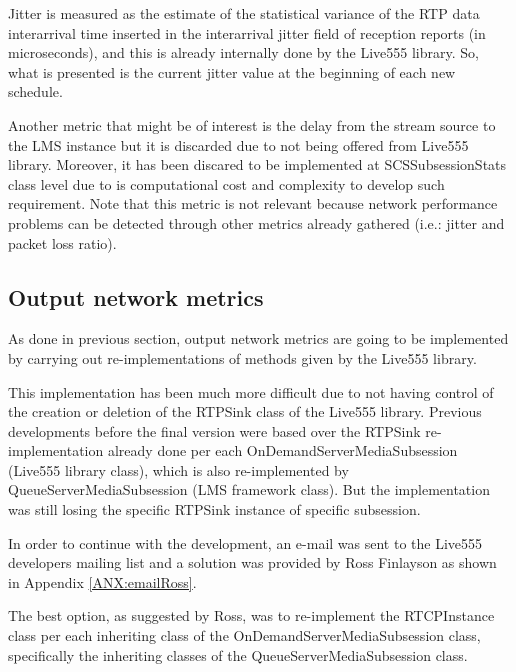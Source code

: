 Jitter is measured as the estimate of the statistical variance of the RTP data interarrival time inserted in the interarrival jitter field of reception reports (in microseconds), and this is already internally done by the Live555 library. So, what is presented is the current jitter value at the beginning of each new schedule.

Another metric that might be of interest is the delay from the stream source to the LMS instance but it is discarded due to not being offered from Live555 library. Moreover, it has been discared to be implemented at SCSSubsessionStats class level due to is computational cost and complexity to develop such requirement. Note that this metric is not relevant because network performance problems can be detected through other metrics already gathered (i.e.: jitter and packet loss ratio).


\subsection{Output network metrics}

As done in previous section, output network metrics are going to be implemented by carrying out re-implementations of methods given by the Live555 library.

This implementation has been much more difficult due to not having control of the creation or deletion of the RTPSink class of the Live555 library. Previous developments before the final version were based over the RTPSink re-implementation already done per each OnDemandServerMediaSubsession (Live555 library class), which is also re-implemented by QueueServerMediaSubsession (LMS framework class). But the implementation was still losing the specific RTPSink instance of specific subsession.

In order to continue with the development, an e-mail was sent to the Live555 developers mailing list and a solution was provided by Ross Finlayson as shown in Appendix \ref{ANX:emailRoss}.

The best option, as suggested by Ross, was to re-implement the RTCPInstance class per each inheriting class of the OnDemandServerMediaSubsession class, specifically the inheriting classes of the QueueServerMediaSubsession class. 

